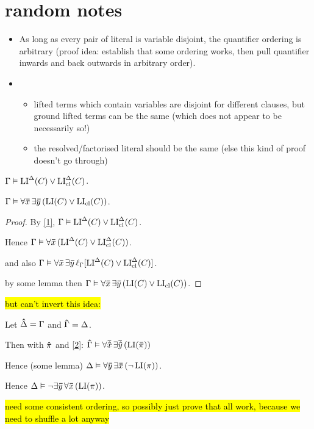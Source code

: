 \documentclass[,%
	draft=false,%
	numbers=noendperiod
	11pt,
	a4paper,
	oneside,%
	openany,
]{memoir}
\begin{document}
\tableofcontents

\section{random notes}

\begin{itemize}
	\item As long as every pair of literal is variable disjoint, the quantifier ordering is arbitrary (proof idea: establish that some ordering works, then pull quantifier inwards and back outwards in arbitrary order).
	\item

		\begin{itemize}
			\item lifted terms which contain variables are disjoint for different clauses,
				but ground lifted terms can be the same (which does not appear to be necessarily so!)
			\item  the resolved/factorised literal should be the same (else this kind of proof doesn't go through)
		\end{itemize}
\end{itemize}

\begin{lemma}
	\label{1}
	$\Gamma \vDash \operatorname{LI}^\Delta(C) \lor \operatorname{LI}_{\operatorname{cl}}^\Delta(C)$.
\end{lemma}

\begin{lemma}
	\label{2}
	$\Gamma \vDash \forall \bm\bar x\,\exists \bm\bar y\,(\operatorname{LI}(C) \lor \operatorname{LI}_{\operatorname{cl}}(C))$.
\end{lemma}
\begin{proof}
	By \ref{1}, 
	$\Gamma \vDash \operatorname{LI}^\Delta(C) \lor \operatorname{LI}_{\operatorname{cl}}^\Delta(C)$.

	Hence 
	$\Gamma \vDash \forall \bm\bar x\,( \operatorname{LI}^\Delta(C) \lor \operatorname{LI}_{\operatorname{cl}}^\Delta(C))$.

	and also 
	$\Gamma \vDash \forall \bm\bar x\,\exists \bm\bar y\,\ell_{\Gamma}[ \operatorname{LI}^\Delta(C) \lor \operatorname{LI}_{\operatorname{cl}}^\Delta(C)]$.

	by some lemma then
	$\Gamma \vDash \forall \bm\bar x\,\exists \bm\bar y\,(\operatorname{LI}(C) \lor \operatorname{LI}_{\operatorname{cl}}(C))$.
\end{proof}

\hl{but can't invert this idea:}

\noindent
Let $\bm\hat \Delta = \Gamma$ and $\bm\hat \Gamma = \Delta$.

Then with $\bm\hat \pi$ and \ref{2}:
$\bm\hat \Gamma \vDash \forall \bm\bar{\bm\hat x}\, \exists \bm\bar{\bm\hat y}\, ( \operatorname{LI}(\bm\bar \pi) )$

Hence (some lemma)
$\Delta \vDash \forall \bm\bar y\, \exists \bm\bar x\, ( \lnot \operatorname{LI}(\pi)  )$.

Hence
$\Delta \vDash \lnot \exists \bm\bar y\, \forall \bm\bar x\, ( \operatorname{LI}(\pi)  )$.

\hl{need some consistent ordering, so possibly just prove that all work, because we need to shuffle a lot anyway}
\end{document}
